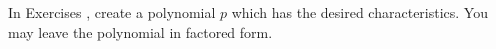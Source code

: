 {\noindent In Exercises}
{, create a polynomial $p$ which has the desired characteristics.  You may leave the polynomial in factored form. }

